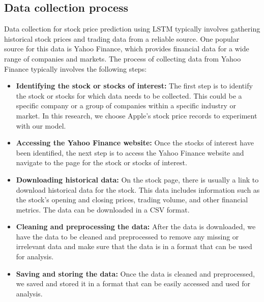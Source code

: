 \documentclass[a4paper]{article}
\begin{document}
\subsection{Data collection process}
Data collection for stock price prediction using LSTM typically involves gathering historical stock prices and trading data from a reliable source. One popular source for this data is Yahoo Finance, which provides financial data for a wide range of companies and markets. The process of collecting data from Yahoo Finance typically involves the following steps:
\begin{itemize}[leftmargin=7.5pt]
    \item \textbf{Identifying the stock or stocks of interest:} The first step is to identify the stock or stocks for which data needs to be collected. This could be a specific company or a group of companies within a specific industry or market. In this research, we choose Apple's stock price records to experiment with our model.
    \item \textbf{Accessing the Yahoo Finance website:} Once the stocks of interest have been identified, the next step is to access the Yahoo Finance website and navigate to the page for the stock or stocks of interest.
    \item \textbf{Downloading historical data:} On the stock page, there is usually a link to download historical data for the stock. This data includes information such as the stock's opening and closing prices, trading volume, and other financial metrics. The data can be downloaded in a CSV format.
    \item \textbf{Cleaning and preprocessing the data:} After the data is downloaded, we have the data to be cleaned and preprocessed to remove any missing or irrelevant data and make sure that the data is in a format that can be used for analysis.
    \item \textbf{Saving and storing the data:} Once the data is cleaned and preprocessed, we saved and stored it in a format that can be easily accessed and used for analysis.
\end{itemize}
\end{document}
